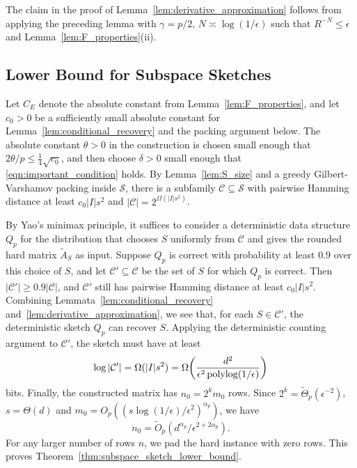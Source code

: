 \documentclass[11pt]{article}
\theoremstyle{remark}
\theoremstyle{definition}
\newcommand{\eps}{\epsilon}
\newcommand{\cC}{\mathcal{C}}
\newcommand{\cS}{\mathcal{S}}
\DeclareMathOperator{\polylog}{polylog}
\begin{document}
The claim in the proof of Lemma~\ref{lem:derivative_approximation} follows from applying the preceding lemma with $\gamma = p/2$, $N \asymp \log(1/\eps)$ such that $R^{-N} \leq \eps$ and Lemma~\ref{lem:F_properties}(ii).

\subsection{Lower Bound for Subspace Sketches}
Let $C_E$ denote the absolute constant from Lemma~\ref{lem:F_properties}, and let
$c_0>0$ be a sufficiently small absolute constant for Lemma~\ref{lem:conditional_recovery}
and the packing argument below.
The absolute constant $\theta>0$ in the construction is chosen small enough that
$2\theta/p\leq \frac{1}{4}\sqrt{c_0}$, and then choose $\delta>0$ small enough
that \eqref{eqn:important_condition} holds.
By Lemma~\ref{lem:S_size} and a greedy Gilbert-Varshamov packing inside $\cS$, there is a subfamily $\cC\subseteq\cS$ with pairwise Hamming distance at least $c_0|I|s^2$ and $|\cC|=2^{\Omega(|I|s^2)}$. 

By Yao's minimax principle, it suffices to consider a deterministic data structure $Q_p$ for the distribution that chooses $S$ uniformly from $\cC$ and gives the rounded hard matrix $\widetilde{A}_S$ as input. Suppose $Q_p$ is correct with probability at least $0.9$ over this choice of $S$, and let $\cC'\subseteq\cC$ be the set of $S$ for which $Q_p$ is correct. Then $|\cC'|\geq 0.9|\cC|$, and $\cC'$ still has pairwise Hamming distance at least $c_0|I|s^2$. Combining Lemmata~\ref{lem:conditional_recovery} and~\ref{lem:derivative_approximation}, we see that, for each $S\in\cC'$, the deterministic sketch $Q_p$ can recover $S$. Applying the deterministic counting argument to $\cC'$, the sketch must have at least
\[
	\log|\cC'| = \Omega(|I|s^2)
	= \Omega\mleft(\frac{d^2}{\eps^2\polylog(1/\eps)}\mright)
\]
bits. Finally, the constructed matrix has $n_0=2^k m_0$ rows. Since $2^k=\widetilde\Theta_p(\eps^{-2})$, $s=\Theta(d)$ and $m_0=O_p((s\log(1/\eps)/\eps^2)^{\alpha_p})$, we have
\[
	n_0=\widetilde O_p(d^{\alpha_p}/\eps^{2+2\alpha_p}).
\]
For any larger number of rows $n$, we pad the hard instance with zero rows. This proves Theorem~\ref{thm:subspace_sketch_lower_bound}.
\end{document}

